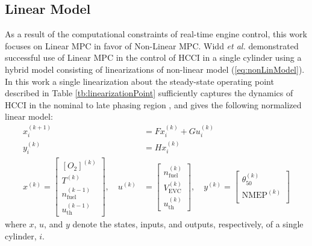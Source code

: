 \subsection{Linear Model}
\label{sec:linearModel}
As a result of the computational constraints of real-time engine control, this work focuses on Linear MPC in favor of Non-Linear MPC. Widd \textit{et al.} \cite{Widd2011} demonstrated successful use of Linear MPC in the control of HCCI in a single cylinder using a hybrid model consisting of linearizations of non-linear model (\ref{eq:nonLinModel}). In this work a single linearization about the steady-state operating point described in Table \ref{tb:linearizationPoint} sufficiently captures the dynamics of HCCI in the nominal to late phasing region \cite{Liao2010}, and gives the following normalized linear model:
\begin{equation}
\begin{aligned}
x_{i}^{(k+1)} &= Fx_{i}^{(k)}+Gu_{i}^{(k)}\\
y_{i}^{(k)} &= Hx_{i}^{(k)}\\
x^{(k)} =
\begin{bmatrix}
[O_2]^{(k)}                     \\[0.3em]
T^{(k)}                         \\[0.3em]
n_{\mathrm{fuel}}^{(k-1)}     \\[0.3em]
u_{\mathrm{th}}^{(k-1)}
\end{bmatrix}, \quad
u^{(k)} &=
\begin{bmatrix}
n_{\mathrm{fuel}}^{(k)}   \\[0.3em]
V_{\mathrm{EVC}}^{(k)}    \\[0.3em]
u_{\mathrm{th}}^{(k)}
\end{bmatrix}, \quad
y^{(k)} =
\begin{bmatrix}
\theta_{50}^{(k)}       \\[0.3em]
\mathrm{NMEP}^{(k)}    \\[0.3em]
\end{bmatrix}
\end{aligned}
\label{eq:sinCylModel}
\end{equation}
where $x$, $u$, and $y$ denote the states, inputs, and outputs, respectively, of a single cylinder, $i$.


